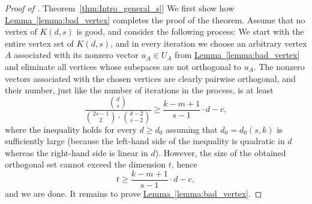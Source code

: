 \documentclass[11pt]{article}
\numberwithin{equation}{section}
\theoremstyle{definition}
\theoremstyle{plain}
\newcommand{\expref}[2]{\hyperref[#2]{#1~\ref{#2}}}
\begin{document}
\begin{proof}[Proof of \expref{Theorem}{thm:Intro_general_s}]
We first show how \expref{Lemma}{lemma:bad_vertex} completes the proof of the theorem.
Assume that no vertex of $K(d,s)$ is good, and consider the  following process: We start with the entire vertex set of $K(d,s)$, and in every iteration we choose an arbitrary vertex $A$ associated with its nonzero vector $u_A \in U_A$ from \expref{Lemma}{lemma:bad_vertex} and eliminate all vertices whose subspaces are not orthogonal to $u_A$. The nonzero vectors associated with the chosen vertices are clearly pairwise orthogonal, and their number, just like the number of iterations in the process, is at least
\[\frac{\binom{d}{s}}{\binom{2s-1}{2} \cdot \binom{d-2}{s-2}} \geq \frac{k-m+1}{s-1} \cdot d-c,\]
where the inequality holds for every $d \geq d_0$ assuming that $d_0 = d_0(s,k)$ is sufficiently large (because the left-hand side of the inequality is quadratic in $d$ whereas the right-hand side is linear in $d$).
However, the size of the obtained orthogonal set cannot exceed the dimension $t$, hence
\[t \geq \frac{k-m+1}{s-1} \cdot d-c,\]
and we are done. It remains to prove \expref{Lemma}{lemma:bad_vertex}.


\end{proof}
\end{document}
